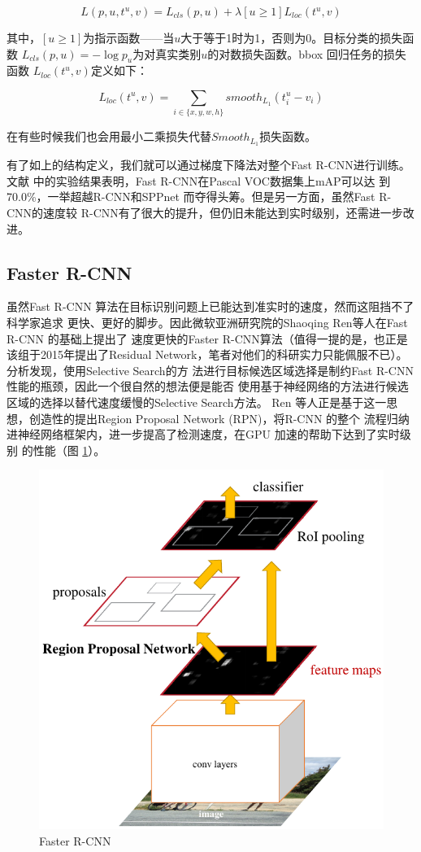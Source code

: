 \[
L(p, u, t^u, v) = L_{cls}(p, u) + \lambda[u \geq 1]L_{loc}(t^u, v)
\]

其中，$[u \geq 1]$为指示函数——当$u$大于等于1时为1，否则为0。目标分类的损失函数
$L_{cls}(p,u) = -\log{p_u}$为对真实类别$u$的对数损失函数。bbox 回归任务的损失函数
$L_{loc}(t^u,v)$定义如下：

\[
L_{loc}(t^u, v) = \sum_{i\in \{x,y,w,h\}}{smooth_{L_1}(t_i^u-v_i)}
\]

在有些时候我们也会用最小二乘损失代替$Smooth_{L_1}$损失函数。

有了如上的结构定义，我们就可以通过梯度下降法对整个Fast R-CNN进行训练。文献
\cite{Girshick:2015ib}中的实验结果表明，Fast R-CNN在Pascal VOC数据集上mAP可以达
到70.0\%，一举超越R-CNN和SPPnet 而夺得头筹。但是另一方面，虽然Fast R-CNN的速度较
R-CNN有了很大的提升，但仍旧未能达到实时级别，还需进一步改进。

\subsection{Faster R-CNN}

虽然Fast R-CNN 算法在目标识别问题上已能达到准实时的速度，然而这阻挡不了科学家追求
更快、更好的脚步。因此微软亚洲研究院的Shaoqing Ren等人在Fast R-CNN 的基础上提出了
速度更快的Faster R-CNN算法\cite{Ren:2015ug}（值得一提的是，也正是该组于2015年提出了Residual
Network，笔者对他们的科研实力只能佩服不已）。分析发现，使用Selective Search的方
法进行目标候选区域选择是制约Fast R-CNN 性能的瓶颈，因此一个很自然的想法便是能否
使用基于神经网络的方法进行候选区域的选择以替代速度缓慢的Selective Search方法。
Ren 等人正是基于这一思想，创造性的提出Region Proposal Network (RPN)，将R-CNN 的整个
流程归纳进神经网络框架内，进一步提高了检测速度，在GPU 加速的帮助下达到了实时级别
的性能（图 \ref{Fig:FasterRCNN}）。

\begin{figure}[ht]
  \centering
  \includegraphics[width=0.8\linewidth]{./Figure/FasterRCNN.png}
  \caption{Faster R-CNN\cite{Ren:2015ug}}\label{Fig:FasterRCNN}
\end{figure}

